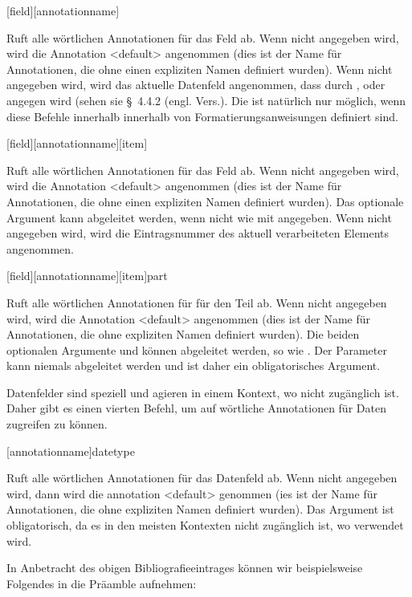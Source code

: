 \documentclass{ltxdockit}[2011/03/25]
\begin{document}
\begin{ltxsyntax}

[field][annotationname]

Ruft alle wörtlichen Annotationen für das Feld  ab. Wenn  
nicht angegeben wird, wird die Annotation <default> angenommen (dies ist der Name
für Annotationen, die ohne einen expliziten Namen definiert wurden). Wenn 
    nicht angegeben wird, wird das aktuelle Datenfeld angenommen, dass durch ,  oder  angegen wird (sehen sie §~4.4.2 (engl. Vers.). %
Die ist natürlich nur möglich, wenn diese Befehle innerhalb innerhalb von Formatierungsanweisungen definiert sind.

[field][annotationname][item]

Ruft alle wörtlichen Annotationen für das Feld  ab. Wenn  
nicht angegeben wird, wird die Annotation <default> angenommen (dies ist der Name
für Annotationen, die ohne einen expliziten Namen definiert wurden). Das optionale
Argument  kann abgeleitet werden, wenn nicht wie mit 
angegeben. Wenn  nicht angegeben wird, wird die Eintragsnummer des aktuell verarbeiteten Elements angenommen.

[field][annotationname][item]{part}

Ruft alle wörtlichen Annotationen für für den Teil ab. Wenn  
nicht angegeben wird, wird die Annotation <default> angenommen (dies ist der Name
für Annotationen, die ohne expliziten Namen definiert wurden). Die beiden optionalen
Argumente  und  können abgeleitet werden, so wie . Der Parameter  kann niemals abgeleitet werden und ist daher ein obligatorisches Argument.

Datenfelder sind speziell und agieren in einem Kontext, wo  nicht
zugänglich ist. Daher gibt es einen vierten Befehl, um auf wörtliche Annotationen für Daten 
zugreifen zu können.

[annotationname]{datetype}

Ruft alle wörtlichen Annotationen für das Datenfeld  ab. Wenn  nicht angegeben wird, dann wird die annotation <default> genommen (ies ist der Name
für Annotationen, die ohne expliziten Namen definiert wurden). Das Argument  ist
obligatorisch, da es in den meisten Kontexten nicht zugänglich ist, wo  verwendet wird.

\end{ltxsyntax}
%
In Anbetracht des obigen Bibliografieeintrages können wir beispielsweise Folgendes
in die Präamble aufnehmen:
\end{document}
